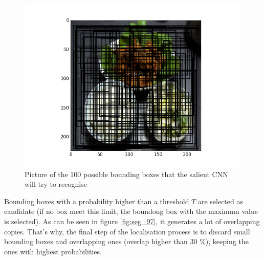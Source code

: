 \begin{figure}
    \centering
    \includegraphics[scale=0.5]{img/seg_100_bboxes.jpg}
    \caption{Picture of the 100 possible bounding boxes that the salient CNN will try to recognise}
    \label{fig:seg_100_bboxes}
\end{figure}

Bounding boxes with a probability higher than a threshold $T$ are selected as candidate (if no box meet this limit, the boundong box with the maximum value is selected). As can be seen in figure \ref{fig:seg_97}, it generates a lot of overlapping copies. That's why, the final step of the localisation process is to discard small bounding boxes and overlapping ones (overlap higher than 30 \%), keeping the ones with highest probabilities.

